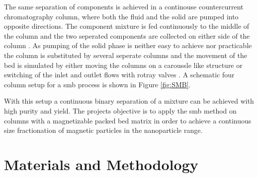 The same separation of components is achieved in a continouse countercurrent chromatography column, where both the fluid and the solid are pumped into opposite directions. The component mixture is fed continuously to the middle of the column and the two seperated components are collected on either side of the column \cite{deckert1994simulierte}. As pumping of the solid phase is neither easy to achieve nor practicable the column is substituted by several seperate columns and the movement of the bed is simulated by either moving the columns on a caroussle like structure or switching of the inlet and outlet flows with rotray valves \cite{SWB-414874366}. A schematic four column setup for a \gls{smb} process is shown in Figure \ref{fig:SMB}.

\begin{figure}[H]
\centering
{}
\end{figure}

With this setup a continuous binary separation of a mixture can be achieved with high purity and yield. The projects objective is to apply the \gls{smb} method on columns with a magnetizable packed bed matrix in order to achieve a continuous size fractionation of magnetic particles in the nanoparticle range.   


\chapter{Materials and Methodology}
\label{chap:chap_mat}

